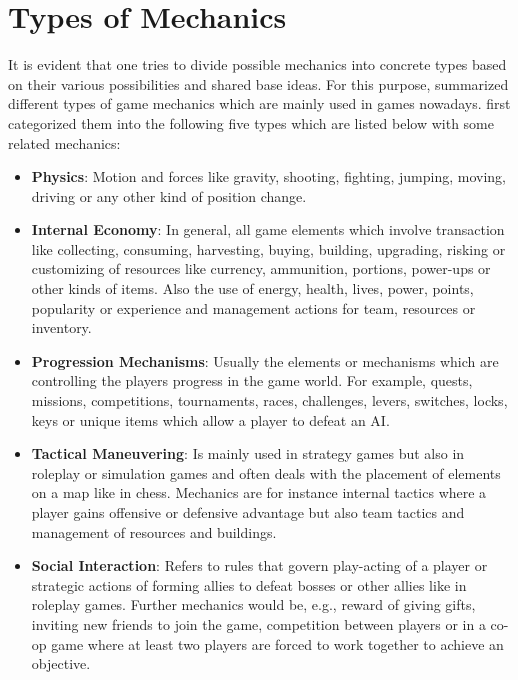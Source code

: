 \documentclass[MGS,Master,english]{twbook}%
\begin{document}
\section{Types of Mechanics}
It is evident that one tries to divide possible mechanics into concrete types based on their various possibilities and shared base ideas. For this purpose, \citep{gameDesign::gameMechanicsAdvancedGameDesign} summarized different types of game mechanics which are mainly used in games nowadays.  first categorized them into the following five types which are listed below with some related mechanics:
\begin{itemize}
	\item \textbf{Physics}: Motion and forces like gravity, shooting, fighting, jumping, moving, driving or any other kind of position change. \cite{gameDesign::gameMechanicsAdvancedGameDesign}
	\item \textbf{Internal Economy}: In general, all game elements which involve transaction like collecting, consuming, harvesting, buying, building, upgrading, risking or customizing of resources like currency, ammunition, portions, power-ups or other kinds of items. Also the use of energy, health, lives, power, points, popularity or experience and management actions for team, resources or inventory. \cite{gameDesign::gameMechanicsAdvancedGameDesign}
	\item \textbf{Progression Mechanisms}: Usually the elements or mechanisms which are controlling the players progress in the game world. For example, quests, missions, competitions, tournaments, races, challenges, levers, switches, locks, keys or unique items which allow a player to defeat an AI. \cite{gameDesign::gameMechanicsAdvancedGameDesign}
	\item \textbf{Tactical Maneuvering}: Is mainly used in strategy games but also in roleplay or simulation games and often deals with the placement of elements on a map like in chess. Mechanics are for instance internal tactics where a player gains offensive or defensive advantage but also team tactics and management of resources and buildings. \cite{gameDesign::gameMechanicsAdvancedGameDesign}
	\item \textbf{Social Interaction}: Refers to rules that govern play-acting of a player or strategic actions of forming allies to defeat bosses or other allies like in roleplay games. Further mechanics would be, e.g., reward of giving gifts, inviting new friends to join the game, competition between players or in a co-op game where at least two players are forced to work together to achieve an objective. \cite{gameDesign::gameMechanicsAdvancedGameDesign}
\end{itemize}
\end{document}
